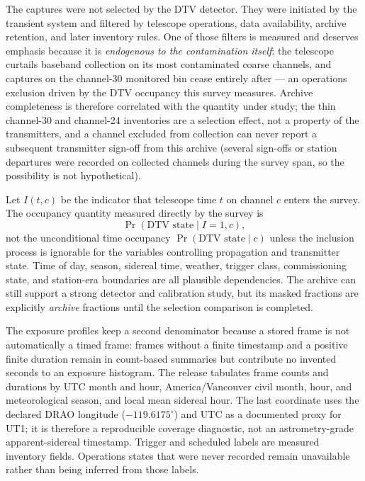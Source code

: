The captures were not selected by the DTV detector.  They were initiated by the
transient system and filtered by telescope operations, data availability,
archive retention, and later inventory rules.  One of those filters is measured
and deserves emphasis because it is \emph{endogenous to the contamination
itself}: the telescope curtails baseband collection on its most contaminated
coarse channels, and captures on the channel-30 monitored bin cease entirely
after  --- an operations exclusion driven by the DTV
occupancy this survey measures.  Archive completeness is therefore correlated
with the quantity under study; the thin channel-30 and channel-24 inventories
are a selection effect, not a property of the transmitters, and a channel
excluded from collection can never report a subsequent transmitter sign-off
from this archive (several sign-offs or station departures were recorded on
collected channels during the survey span, so the possibility is not
hypothetical).

Let $I(t,c)$ be the indicator that telescope time $t$ on channel $c$ enters the
survey.  The occupancy quantity measured directly by the survey is
\begin{equation}
\Pr(\text{DTV state} \mid I = 1, c),
\end{equation}
not the unconditional time occupancy $\Pr(\text{DTV state} \mid c)$ unless the
inclusion process is ignorable for the variables controlling propagation and
transmitter state.  Time of day, season, sidereal time, weather, trigger class,
commissioning state, and station-era boundaries are all plausible dependencies.
The archive can still support a strong detector and calibration study, but its
masked fractions are explicitly \emph{archive} fractions until the selection
comparison is completed.

The exposure profiles keep a second denominator because a stored frame is not
automatically a timed frame: frames without a finite timestamp and a positive
finite duration remain in count-based summaries but contribute no invented
seconds to an exposure histogram.  The release tabulates frame counts and
durations by UTC month and hour, America/Vancouver civil month, hour, and
meteorological season, and local mean sidereal hour.  The last coordinate uses
the declared DRAO longitude ($-119.6175^\circ$) and UTC as a documented proxy
for UT1; it is therefore a reproducible coverage diagnostic, not an
astrometry-grade apparent-sidereal timestamp.  Trigger and scheduled labels are
measured inventory fields.  Operations states that were never recorded remain
unavailable rather than being inferred from those labels.

